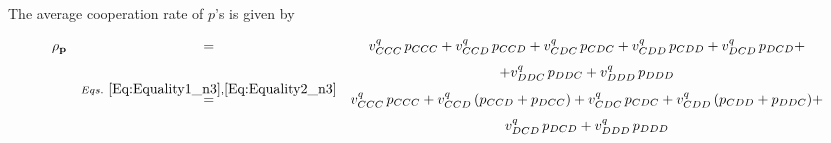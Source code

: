 \documentclass{article}
\theoremstyle{definition}
\begin{document}
The average cooperation rate of $p$'s is given by

\begin{equation}\label{Eq:rhop_n3}
  \begin{array}{rcc}
  \rho_\mathbf{p} & = & \displaystyle v^q_{CCC}\, p_{CCC}+ v^q_{CCD}\, p_{CCD} + v^q_{CDC}\, p_{CDC} + v^q_{CDD}\, p_{CDD} + v^q_{DCD}\, p_{DCD} +  \\ [.7em]
  & & + v^q_{DDC}\, p_{DDC} + v^q_{DDD}\, p_{DDD} \\
  & \stackrel{Eqs.~\eqref{Eq:Equality1_n3}, \eqref{Eq:Equality2_n3}}{=} & \displaystyle v^q_{CCC}\, p_{CCC}+ v^q_{CCD}\, (p_{CCD} + p_{DCC}) + v^q_{CDC}\, p_{CDC} + v^q_{CDD}\, (p_{CDD} + p_{DDC}) + \\ [.7em]
  & & v^q_{DCD}\, p_{DCD} + v^q_{DDD}\, p_{DDD}
  \end{array}
\end{equation}
 
\end{document}
